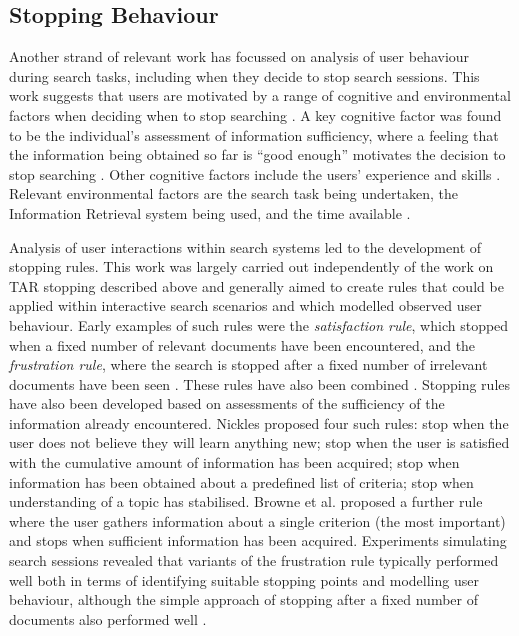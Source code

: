 \documentclass[sigconf,natbib=true,anonymous=true]{acmart}
\begin{document}
\subsection{Stopping Behaviour}
Another strand of relevant work has focussed on analysis of user behaviour during search tasks, including when they decide to stop search sessions. This work suggests that users are motivated by a range of cognitive and environmental factors when deciding when to stop searching \cite{ilani2024analysis}. A key cognitive factor was found to be the individual's assessment of information sufficiency, where a feeling that the information being obtained so far is ``good enough'' motivates the decision to stop searching  \cite{cooper1973selecting,prabha2007enough,zach2005enough,dostert2009users}. Other cognitive factors include the users' experience and skills \cite{wu2014online,pennington2016much}. Relevant environmental factors are the search task being undertaken, the Information Retrieval system being used, and the time available \cite{wu2014online,azzopardi2013query,dostert2009users}.

Analysis of user interactions within search systems led to the development of stopping rules. This work was largely carried out independently of the work on TAR stopping described above and generally aimed to create rules that could be applied within interactive search scenarios and which modelled observed user behaviour. 
Early examples of such rules were the {\it satisfaction rule}, which stopped when a fixed number of relevant documents have been encountered, and the {\it frustration rule}, where the search is stopped after a fixed number of irrelevant documents have been seen \cite{cooper1973selecting}. These rules have also been combined \cite{kraft1979stopping}. Stopping rules have also been developed based on assessments of the sufficiency of the information already encountered. Nickles \cite{nickles1995judgment} proposed four such rules: stop when the user does not believe they will learn anything new; stop when the user is satisfied with the cumulative amount of information has been acquired; stop when information has been obtained about a predefined list of criteria; stop when understanding of a topic has stabilised. Browne et al. \cite{browne2005stopping} proposed a further rule where the user gathers information about a single criterion (the most important) and stops when sufficient information has been acquired. Experiments simulating search sessions revealed that variants of the frustration rule typically performed well both in terms of identifying suitable stopping points and modelling user behaviour, although the simple approach of stopping after a fixed number of documents also performed well \cite{maxwell2015initial,maxwell2015searching,maxwell2019modelling}. 
\end{document}
